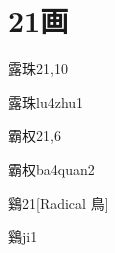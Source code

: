 
\section*{21画}

\begin{entry}{露珠}{21,10}
  \begin{phonetics}{露珠}{lu4zhu1}
  \end{phonetics}
\end{entry}

\begin{entry}{霸权}{21,6}
  \begin{phonetics}{霸权}{ba4quan2}
  \end{phonetics}
\end{entry}

\begin{entry}{鷄}{21}[Radical 鳥]
  \begin{phonetics}{鷄}{ji1}
  \end{phonetics}
\end{entry}


